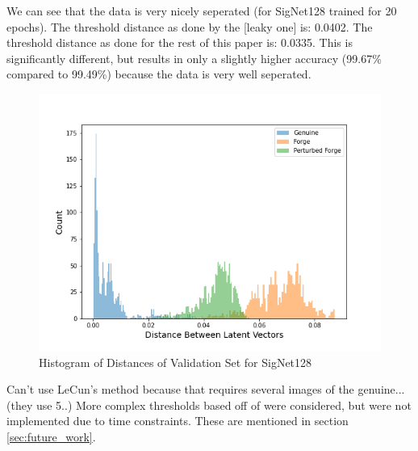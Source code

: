 We can see that the data is very nicely seperated (for SigNet128 trained for 20 epochs).
The threshold distance as done by the [leaky one] is: 0.0402.
The threshold distance as done for the rest of this paper is: 0.0335.
This is significantly different, but results in only a slightly higher accuracy (99.67\% compared to 99.49\%) because the data is very well seperated.
\begin{figure}[h]
    \begin{center}
        \includegraphics[width=0.8\linewidth]{distance_histogram_signet_128.png}
    \end{center}
    \caption{Histogram of Distances of Validation Set for SigNet128}
    \label{fig:hist_distances}
\end{figure}

Can't use LeCun's method because that requires several images of the genuine... (they use 5..)
More complex thresholds based off of \cite{LeCun} were considered, but were not implemented due to time constraints.
These are mentioned in section \ref{sec:future_work}.





